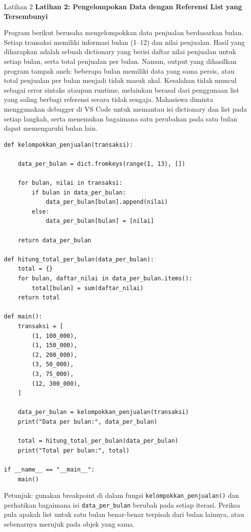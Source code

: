 \documentclass[aspectratio=169, table]{beamer}
\begin{document}
\begin{frame}[fragile,allowframebreaks=0.8]{Latihan 2}
\footnotesize
\textbf{Latihan 2: Pengelompokan Data dengan Referensi List yang Tersembunyi}\par\medskip
Program berikut berusaha mengelompokkan data penjualan berdasarkan bulan. Setiap transaksi memiliki informasi bulan (1--12) dan nilai penjualan. Hasil yang diharapkan adalah sebuah dictionary yang berisi daftar nilai penjualan untuk setiap bulan, serta total penjualan per bulan. Namun, output yang dihasilkan program tampak aneh: beberapa bulan memiliki data yang sama persis, atau total penjualan per bulan menjadi tidak masuk akal. Kesalahan tidak muncul sebagai error sintaks ataupun runtime, melainkan berasal dari penggunaan list yang saling berbagi referensi secara tidak sengaja. Mahasiswa diminta menggunakan debugger di VS Code untuk memantau isi dictionary dan list pada setiap langkah, serta menemukan bagaimana satu perubahan pada satu bulan dapat memengaruhi bulan lain.

\begin{lstlisting}[style=PythonStyle, breaklines=true]
def kelompokkan_penjualan(transaksi):

    data_per_bulan = dict.fromkeys(range(1, 13), [])

    for bulan, nilai in transaksi:
        if bulan in data_per_bulan:
            data_per_bulan[bulan].append(nilai)
        else:
            data_per_bulan[bulan] = [nilai]

    return data_per_bulan

def hitung_total_per_bulan(data_per_bulan):
    total = {}
    for bulan, daftar_nilai in data_per_bulan.items():
        total[bulan] = sum(daftar_nilai)
    return total

def main():
    transaksi = [
        (1, 100_000),
        (1, 150_000),
        (2, 200_000),
        (3, 50_000),
        (3, 75_000),
        (12, 300_000),
    ]

    data_per_bulan = kelompokkan_penjualan(transaksi)
    print("Data per bulan:", data_per_bulan)

    total = hitung_total_per_bulan(data_per_bulan)
    print("Total per bulan:", total)

if __name__ == "__main__":
    main()
\end{lstlisting}

Petunjuk: gunakan breakpoint di dalam fungsi \texttt{kelompokkan\_penjualan()} dan perhatikan bagaimana isi \texttt{data\_per\_bulan} berubah pada setiap iterasi. Periksa pula apakah list untuk satu bulan benar-benar terpisah dari bulan lainnya, atau sebenarnya merujuk pada objek yang sama.
\end{frame}
\end{document}
